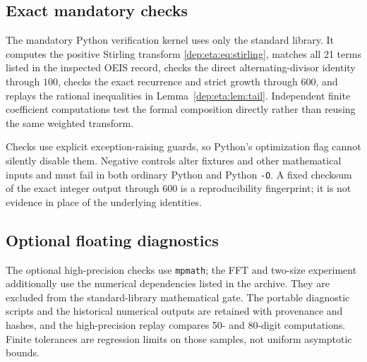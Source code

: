 \documentclass[11pt]{article}
\theoremstyle{definition}\newtheorem{definition}[theorem]{Definition}
\theoremstyle{remark}\newtheorem{remark}[theorem]{Remark}
\begin{document}
\subsection{Exact mandatory checks}
The mandatory Python verification kernel uses only the standard
library. It computes the positive Stirling transform
\eqref{dep:eta:eq:stirling}, matches all 21 terms listed in the inspected
OEIS record, checks the direct alternating-divisor identity through
$100$, checks the exact recurrence and strict growth through $600$,
and replays the rational inequalities in Lemma~\ref{dep:eta:lem:tail}.
Independent finite coefficient computations test the formal
composition directly rather than reusing the same weighted transform.

Checks use explicit exception-raising guards, so Python's
optimization flag cannot silently disable them. Negative controls
alter fixtures and other mathematical inputs and must fail in both
ordinary Python and Python \texttt{-O}. A fixed checksum of the
exact integer output through $600$ is a reproducibility fingerprint;
it is not evidence in place of the underlying identities.

\subsection{Optional floating diagnostics}
The optional high-precision checks use \texttt{mpmath}; the FFT and
two-size experiment additionally use the numerical dependencies
listed in the archive. They are excluded from the standard-library
mathematical gate. The portable diagnostic scripts and the historical numerical
outputs are retained with provenance and hashes, and the high-precision
replay compares 50- and 80-digit computations. Finite tolerances are
regression limits on those samples, not uniform asymptotic bounds.
\end{document}
